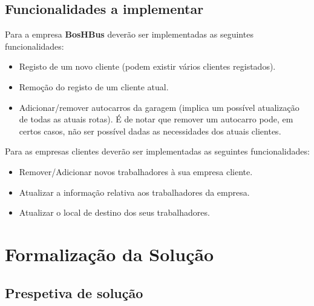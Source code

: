 \documentclass{report}
\begin{document}
  \section{Funcionalidades a implementar}
    Para a empresa \textbf{BosHBus} deverão ser implementadas as seguintes
    funcionalidades:
    \begin{itemize}
    \item Registo de um novo cliente (podem existir vários clientes registados).
    \item Remoção do registo de um cliente atual.
    \item Adicionar/remover autocarros da garagem (implica um possível atualização
      de todas as atuais rotas). É de notar que remover um autocarro pode, em certos
      casos, não ser possível dadas as necessidades dos atuais clientes.
    \end{itemize}
    \newpage
    Para as empresas clientes deverão ser implementadas as seguintes funcionalidades:
    \begin{itemize}
    \item Remover/Adicionar novos trabalhadores à sua empresa cliente.
    \item Atualizar a informação relativa aos trabalhadores da empresa.
    \item Atualizar o local de destino dos seus trabalhadores.
    \end{itemize}

\chapter{Formalização da Solução}
  \section{Prespetiva de solução}
\end{document}
